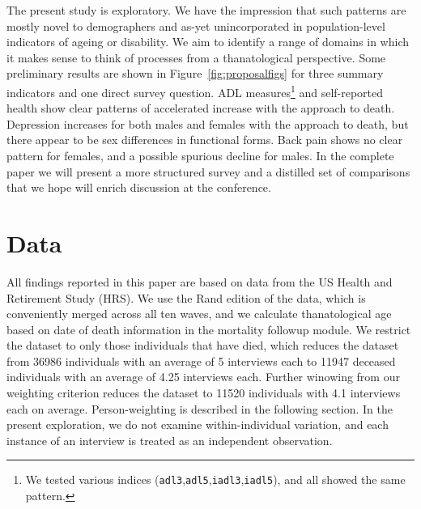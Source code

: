 \documentclass{article}
\begin{document}
The present study is exploratory. We have the impression
that such patterns are mostly novel to demographers and as-yet unincorporated in
population-level indicators of ageing or disability. We aim to identify a
range of domains in which it makes sense to think of processes from a
thanatological perspective. Some preliminary results are shown in
Figure~\ref{fig:proposalfigs} for three summary indicators and one direct survey
question. ADL measures\footnote{We tested various indices
(\texttt{adl3},\texttt{adl5},\texttt{iadl3},\texttt{iadl5}), and all showed the
same pattern.} and self-reported health show clear patterns of
accelerated increase with the approach to death. Depression increases for both
males and females with the approach to death, but there appear to be sex
differences in functional forms. Back pain shows no clear pattern for females,
and a possible spurious decline for males. In the complete paper we will present a
more structured survey and a distilled set of comparisons that we hope will
enrich discussion at the conference. 


\section{Data}
All findings reported in this paper are based on data from the US Health and
Retirement Study (HRS). We use the Rand edition of the data, which is
conveniently merged across all ten waves, and we calculate thanatological age
based on date of death information in the mortality followup module. We
restrict the dataset to only those individuals that have died, which reduces the
dataset from 36986 individuals with an average of 5 interviews each to 11947
deceased individuals with an average of 4.25 interviews each. Further winowing
from our weighting criterion reduces the dataset to
11520 individuals with 4.1 interviews each on average. Person-weighting is
described in the following section. In the present exploration, we do not examine
within-individual variation, and each instance of an interview is treated as an
independent observation.
\end{document}
